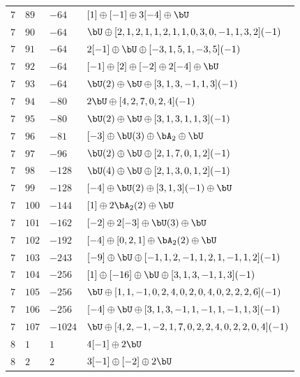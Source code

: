\begin{center}
\begin{longtable}{llll}
 \(7\) & \(89\) & \(-64\) & \([1] \oplus [-1] \oplus 3 [-4] \oplus \bU\) \\
 \(7\) & \(90\) & \(-64\) & \(\bU \oplus [2, 1, 2, 1, 1, 2, 1, 1, 0, 3, 0, -1, 1, 3, 2](-1)\) \\
 \(7\) & \(91\) & \(-64\) & \(2 [-1] \oplus \bU \oplus [-3, 1, 5, 1, -3, 5](-1)\) \\
 \(7\) & \(92\) & \(-64\) & \([-1] \oplus [2] \oplus [-2] \oplus 2 [-4] \oplus \bU\) \\
 \(7\) & \(93\) & \(-64\) & \(\bU(2) \oplus \bU \oplus [3, 1, 3, -1, 1, 3](-1)\) \\
 \(7\) & \(94\) & \(-80\) & \(2 \bU \oplus [4, 2, 7, 0, 2, 4](-1)\) \\
 \(7\) & \(95\) & \(-80\) & \(\bU(2) \oplus \bU \oplus [3, 1, 3, 1, 1, 3](-1)\) \\
 \(7\) & \(96\) & \(-81\) & \([-3] \oplus \bU(3) \oplus \bA_{2} \oplus \bU\) \\
 \(7\) & \(97\) & \(-96\) & \(\bU(2) \oplus \bU \oplus [2, 1, 7, 0, 1, 2](-1)\) \\
 \(7\) & \(98\) & \(-128\) & \(\bU(4) \oplus \bU \oplus [2, 1, 3, 0, 1, 2](-1)\) \\
 \(7\) & \(99\) & \(-128\) & \([-4] \oplus \bU(2) \oplus [3, 1, 3](-1) \oplus \bU\) \\
 \(7\) & \(100\) & \(-144\) & \([1] \oplus 2 \bA_{2}(2) \oplus \bU\) \\
 \(7\) & \(101\) & \(-162\) & \([-2] \oplus 2 [-3] \oplus \bU(3) \oplus \bU\) \\
 \(7\) & \(102\) & \(-192\) & \([-4] \oplus [0, 2, 1] \oplus \bA_{2}(2) \oplus \bU\) \\
 \(7\) & \(103\) & \(-243\) & \([-9] \oplus \bU \oplus [-1, 1, 2, -1, 1, 2, 1, -1, 1, 2](-1)\) \\
 \(7\) & \(104\) & \(-256\) & \([1] \oplus [-16] \oplus \bU \oplus [3, 1, 3, -1, 1, 3](-1)\) \\
 \(7\) & \(105\) & \(-256\) & \(\bU \oplus [1, 1, -1, 0, 2, 4, 0, 2, 0, 4, 0, 2, 2, 2, 6](-1)\) \\
 \(7\) & \(106\) & \(-256\) & \([-4] \oplus \bU \oplus [3, 1, 3, -1, 1, -1, 1, -1, 1, 3](-1)\) \\
 \(7\) & \(107\) & \(-1024\) & \(\bU \oplus [4, 2, -1, -2, 1, 7, 0, 2, 2, 4, 0, 2, 2, 0, 4](-1)\) \\
\midrule
 \(8\) & \(1\) & \(1\) & \(4 [-1] \oplus 2 \bU\) \\
 \(8\) & \(2\) & \(2\) & \(3 [-1] \oplus [-2] \oplus 2 \bU\) \\

\end{longtable}
\end{center}
